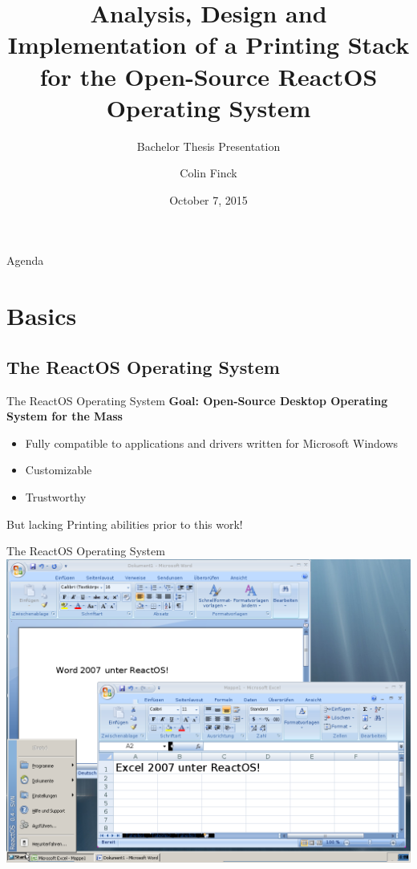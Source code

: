 \documentclass[aspectratio=1610]{beamer}
\title[Printing Stack for the ReactOS Operating System]{Analysis, Design and Implementation of a Printing Stack \\for the Open-Source ReactOS Operating System}
\subtitle{Bachelor Thesis Presentation}
\author{Colin Finck}
\institute[ACS]{Automation of Complex Power Systems}
\date{October 7, 2015}
\newcommand\myheading[1]{{\Large\bfseries#1}\par\bigskip}
\begin{document}
\begin{frame}{Agenda}
	\tableofcontents
\end{frame}

\section{Basics}

\subsection{The ReactOS Operating System}
\begin{frame}{The ReactOS Operating System}
	\myheading{Goal: Open-Source Desktop Operating System for the Mass}
	
	\begin{itemize}
		\item Fully compatible to applications and drivers written for Microsoft Windows
		\item Customizable
		\item Trustworthy
	\end{itemize}
	
	\bigskip
	\pause
	
	But lacking Printing abilities prior to this work!
\end{frame}

\begin{frame}{The ReactOS Operating System}
	\centering
	\includegraphics{pictures/office2007ros}
\end{frame}
\end{document}
